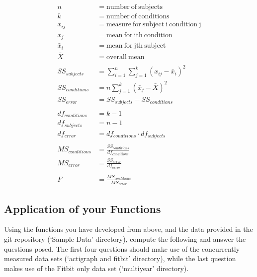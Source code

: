 \documentclass[11pt]{article}
\begin{document}
\begin{align*}
    n &= \mathrm{number~of~subjects} \\
    k &= \mathrm{number~of~conditions} \\
    x_{ij} &= \mathrm{measure~for~subject~i~condition~j} \\
    \bar{x}_j &= \mathrm{mean~for~ith~condition} \\
    \bar{x}_i &= \mathrm{mean~for~jth~subject} \\
    \bar{X} &= \mathrm{overall~mean} \\
    ~&\\
    SS_{subjects} &= \sum_{i=1}^n \sum_{j=1}^k (x_{ij} - \bar{x}_i)^2 \\
    SS_{conditions} &=  n \sum_{j=1}^k (\bar{x}_j - \bar{X})^2 \\
    SS_{error} &= SS_{subjects} - SS_{conditions} \\
    ~&\\
    df_{conditions} &= k-1 \\
    df_{subjects} &= n-1 \\
    df_{error} &= df_{conditions} \cdot df_{subjects} \\
    ~&\\
    MS_{conditions} &= \frac{SS_{conditions}}{df_{conditions}} \\
    MS_{error} &= \frac{SS_{error}}{df_{error}} \\
    ~&\\
    F &= \frac{MS_{conditions}}{MS_{error}}
\end{align*}

\subsection*{Application of your Functions}
Using the functions you have developed from above, and the data provided in the git repository (`Sample Data' directory), compute the following and answer the questions posed.  The first four questions should make use of the concurrently measured data sets (`actigraph and fitbit' directory), while the last question makes use of the Fitbit only data set (`multiyear' directory).
\end{document}
